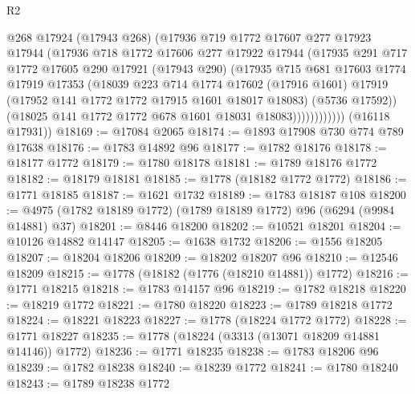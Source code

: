 \begin{lexlean}{R2}
\begin{coremodule}
                    @268
                    @17924
                    (@17943 @268)
                    (@17936
                      @719
                      @1772
                      @17607
                      @277
                      @17923
                      @17944
                      (@17936
                        @718
                        @1772
                        @17606
                        @277
                        @17922
                        @17944
                        (@17935
                          @291
                          @717
                          @1772
                          @17605
                          @290
                          @17921
                          (@17943 @290)
                          (@17935
                            @715
                            @681
                            @17603
                            @1774
                            @17919
                            @17353
                            (@18039
                              @223
                              @714
                              @1774
                              @17602
                              (@17916 @1601)
                              @17919
                              (@17952 @141 @1772 @1772 @17915 @1601 @18017 @18083)
                              (@5736 @17592))
                            (@18025 @141 @1772 @1772 @678 @1601 @18031 @18083))))))))))))
      (@16118 @17931))
@18169 := @17084 @2065
@18174 := @1893 @17908 @730 @774 @789 @17638
@18176 := @1783 @14892 @96
@18177 := @1782 @18176
@18178 := @18177 @1772
@18179 := @1780 @18178
@18181 := @1789 @18176 @1772
@18182 := @18179 @18181
@18185 := @1778 (@18182 @1772 @1772)
@18186 := @1771 @18185
@18187 := @1621 @1732
@18189 := @1783 @18187 @108
@18200 := @4975 (@1782 @18189 @1772) (@1789 @18189 @1772) @96 (@6294 (@9984 @14881) @37)
@18201 := @8446 @18200
@18202 := @10521 @18201
@18204 := @10126 @14882 @14147
@18205 := @1638 @1732
@18206 := @1556 @18205
@18207 := @18204 @18206
@18209 := @18202 @18207 @96
@18210 := @12546 @18209
@18215 := @1778 (@18182 (@1776 (@18210 @14881)) @1772)
@18216 := @1771 @18215
@18218 := @1783 @14157 @96
@18219 := @1782 @18218
@18220 := @18219 @1772
@18221 := @1780 @18220
@18223 := @1789 @18218 @1772
@18224 := @18221 @18223
@18227 := @1778 (@18224 @1772 @1772)
@18228 := @1771 @18227
@18235 := @1778 (@18224 (@3313 (@13071 @18209 @14881 @14146)) @1772)
@18236 := @1771 @18235
@18238 := @1783 @18206 @96
@18239 := @1782 @18238
@18240 := @18239 @1772
@18241 := @1780 @18240
@18243 := @1789 @18238 @1772

\end{coremodule}
\end{lexlean}

